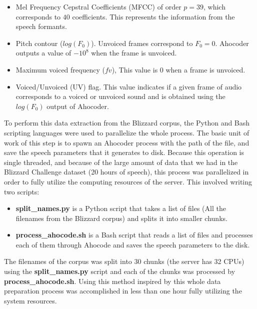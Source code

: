 \begin{itemize}
    \item{Mel Frequency Cepstral Coefficients (MFCC) of order $p = 39$, which corresponds to $40$ coefficients. This represents the information from the speech formants.}
    \item{Pitch contour ($log(F_0)$). Unvoiced frames correspond to $F_0 = 0$. Ahocoder outputs a value of $-10^8$ when the frame is unvoiced.}
    \item{Maximum voiced frequency ($fv$), This value is 0 when a frame is unvoiced.}
    \item{Voiced/Unvoiced (UV) flag. This value indicates if a given frame of audio corresponds to a voiced or unvoiced sound and is obtained using the $log(F_0)$ output of Ahocoder.}
\end{itemize}

To perform this data extraction from the Blizzard corpus, the Python and Bash scripting languages were used to parallelize the whole process. The basic unit of work of this step is to spawn an Ahocoder process with the path of the file, and save the speech parameters that it generates to disk. Because this operation is single threaded, and because of the large amount of data that we had in the Blizzard Challenge dataset (20 hours of speech), this process was parallelized in order to fully utilize the computing resources of the server. This involved writing two scripts:

\begin{itemize}
    \item \textbf{split\_names.py} is a Python script that takes a list of files (All the filenames from the Blizzard corpus) and splits it into smaller chunks.
    \item \textbf{process\_ahocode.sh} is a Bash script that reads a list of files and processes each of them through Ahocode and saves the speech parameters to the disk.
\end{itemize}

The filenames of the corpus was split into 30 chunks (the server has 32 CPUs) using the \textbf{split\_names.py} script and each of the chunks was processed by \textbf{process\_ahocode.sh}. Using this method inspired by \cite{pascual2016deep} this whole data preparation process was accomplished in less than one hour fully utilizing the system resources.

